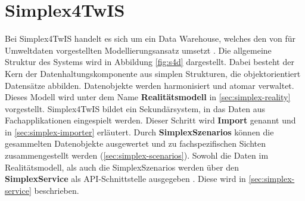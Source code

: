 \section{Simplex4TwIS}

Bei Simplex4TwIS handelt es sich um ein Data Warehouse, welches den von \textcite{rudolfUmweltdatenmanagementGeoInspiration2018} für Umweltdaten vorgestellten Modellierungsansatz umsetzt \parencite{grossmannFachsystemeSchemaevolution2024}. Die allgemeine Struktur des Systems wird in Abbildung \ref{fig:s4d} dargestellt. Dabei besteht der Kern der Datenhaltungskomponente aus simplen Strukturen, die objektorientiert Datensätze abbilden. Datenobjekte werden harmonisiert und atomar verwaltet. Dieses Modell wird unter dem Name \textbf{Realitätsmodell} in \ref{sec:simplex-reality} vorgestellt. Simplex4TwIS bildet ein Sekundärsystem, in das Daten aus Fachapplikationen eingespielt werden. Dieser Schritt wird \textbf{Import} genannt und in \ref{sec:simplex-importer} erläutert. Durch \textbf{SimplexSzenarios} können die gesammelten Datenobjekte ausgewertet und zu fachspezifischen Sichten zusammengestellt werden (\ref{sec:simplex-scenarios}). Sowohl die Daten im Realitätsmodell, als auch die SimplexSzenarios werden über den \textbf{SimplexService} als \acs{API}-Schnittstelle ausgegeben \parencite{grossmannEnvVisioService2022}. Diese wird in \ref{sec:simplex-service} beschrieben.


